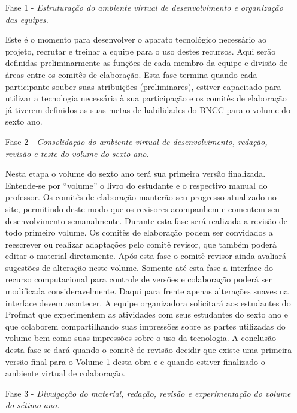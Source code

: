 \documentclass[10 pt]{article}
\begin{document}
\begin{enumerate}
\item[Fase 1 -] {\it Estruturação do ambiente virtual de desenvolvimento e organização das equipes.}

Este é o momento para desenvolver o aparato tecnológico necessário ao projeto, recrutar e treinar a equipe para o uso destes recursos.
Aqui serão definidas preliminarmente as funções de cada membro da equipe e divisão de áreas entre os comitês de elaboração.
Esta fase termina quando cada participante souber suas atribuições (preliminares), estiver capacitado para utilizar a tecnologia necessária à sua participação e os comitês de elaboração já tiverem definidos as suas metas de habilidades do BNCC para o volume do sexto ano.

\item[Fase 2 -] {\it Consolidação do ambiente virtual de desenvolvimento, redação, revisão e teste do volume do sexto ano.}

Nesta etapa o volume do sexto ano terá sua primeira versão finalizada. Entende-se por ``volume'' o livro do estudante e o respectivo manual do professor.
Os comitês de elaboração manterão seu progresso atualizado no site, permitindo deste modo que os revisores acompanhem e comentem seu desenvolvimento semanalmente.
Durante esta fase será realizada a revisão de todo primeiro volume.
Os comitês de elaboração podem ser convidados a reescrever ou realizar adaptações pelo comitê revisor, que também poderá editar o material diretamente.
Após esta fase o comitê revisor ainda avaliará sugestões de alteração neste volume.
Somente até esta fase a interface do recurso computacional para controle de versões e colaboração poderá ser modificada consideravelmente.
Daqui para frente apenas alterações suaves na interface devem acontecer.
A equipe organizadora solicitará aos estudantes do Profmat que experimentem as atividades com seus estudantes do sexto ano e que colaborem compartilhando suas impressões sobre as partes utilizadas do volume bem como suas impressões sobre o uso da tecnologia.
A conclusão desta fase se dará quando o comitê de revisão decidir que existe uma primeira versão final para o Volume 1 desta obra e e quando estiver finalizado o ambiente virtual de colaboração.


\item[Fase 3 -] {\it Divulgação do material, redação, revisão e experimentação do volume do sétimo ano.}


\end{enumerate}
\end{document}
